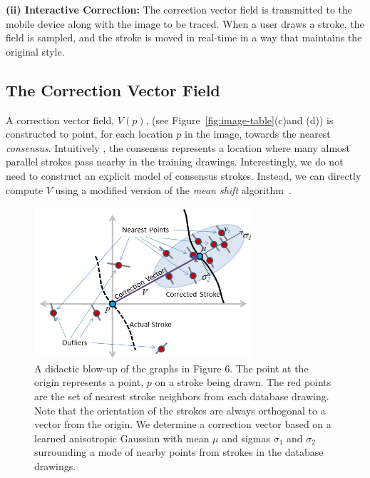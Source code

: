 \textbf{(ii) Interactive Correction:} The correction vector field is transmitted to the mobile device along with the image to be traced.  When a user draws a stroke, the field is sampled, and the stroke is moved in real-time in a way that maintains the original style.

\subsection{The Correction Vector Field}



A correction vector field, $V(p)$, (see Figure~\ref{fig:image-table}(c)and (d)) is constructed to point, for each location $p$ in the image, towards the nearest {\em consensus}. Intuitively , the consensus represents a location where many almost parallel strokes pass nearby in the training drawings. Interestingly, we do not need to construct an explicit model of consensus strokes. Instead, we can directly compute $V$ using a modified version of the {\em mean shift} algorithm~\cite{10.1109/ICCV.1999.790416}.


\begin{figure}[!t]
  \centering%
  \includegraphics[width=3.2in]{ellipse.png}
  \caption{A didactic blow-up of the graphs in Figure 6. The point at the origin represents a point, $p$ on a stroke being drawn. The red points are the set of nearest stroke neighbors from each database drawing. Note that the orientation of the strokes are always orthogonal to a vector from the origin. We determine a correction vector based on a learned anisotropic Gaussian with mean $\mu$ and sigmas $\sigma_1$ and $\sigma_2$ surrounding a mode of nearby points from strokes in the database drawings.}
  \label{fig:ellipse}
\end{figure}

